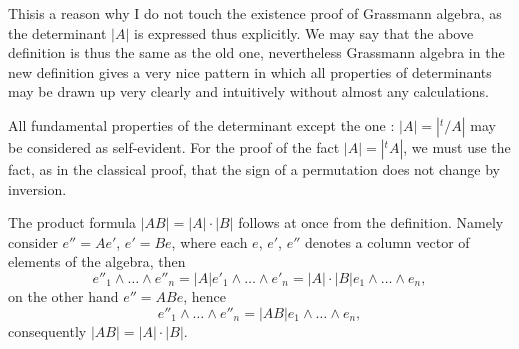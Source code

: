 This\pageoriginale is a reason why I do not touch the existence proof
of Grassmann algebra, as the determinant $|A|$ is expressed thus
explicitly. We may say that the above definition is thus the same as
the old one, nevertheless Grassmann algebra in the new definition
gives a very nice pattern in which all properties of determinants may
be drawn up very clearly and intuitively without almost any
calculations.

All fundamental properties of the determinant except the one : $|A| =
|^t/A|$ may be considered as self-evident. For the proof of the fact
$|A| = |^tA|$, we must use the fact, as in the classical proof, that
the sign of a permutation does not change by inversion.

The product formula $|AB| = |A| \cdot |B|$ follows at once from the
definition. Namely consider $e'' = Ae'$, $e'= Be$, where each $e$,
$e'$, $e''$ denotes a column vector of elements of the algebra, then
$$
e''_1 \wedge \ldots \wedge e''_n  = |A| e'_1 \wedge \ldots \wedge e'_n
= |A| \cdot |B| e_1 \wedge \ldots \wedge e_n,
$$
on the other hand $e''= ABe$, hence
$$
e''_1 \wedge \ldots \wedge e''_n = |AB| e_1 \wedge \ldots \wedge e_n,
$$
consequently $|AB|  = |A| \cdot |B|$.

